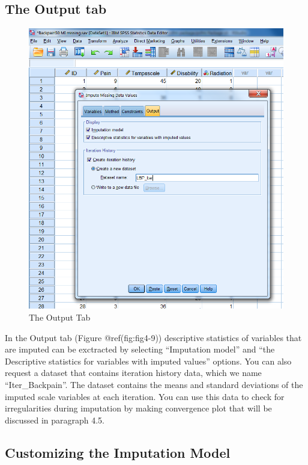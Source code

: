 \documentclass[
]{book}
\begin{document}
\hypertarget{the-output-tab}{%
\subsection{The Output tab}\label{the-output-tab}}

\begin{figure}

{\centering \includegraphics[width=0.9\linewidth]{images/fig4.9} 

}

\caption{The Output Tab}\label{fig:fig4-9}
\end{figure}

In the Output tab (Figure @ref(fig:fig4-9)) descriptive statistics of
variables that are imputed can be exctracted by selecting ``Imputation
model'' and ``the Descriptive statistics for variables with imputed
values'' options. You can also request a dataset that contains iteration
history data, which we name ``Iter\_Backpain''. The dataset contains the
means and standard deviations of the imputed scale variables at each
iteration. You can use this data to check for irregularities during
imputation by making convergence plot that will be discussed in
paragraph 4.5.

\hypertarget{customizing-the-imputation-model}{%
\subsection{Customizing the Imputation
Model}\label{customizing-the-imputation-model}}
\end{document}
